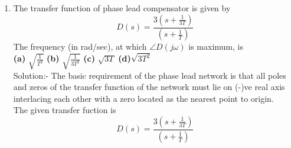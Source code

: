 \documentclass[journal,12pt,twocolumn]{IEEEtran}
\renewcommand\thesection{\arabic{section}}
\begin{document}
\begin{enumerate}[label=\arabic*.,ref=\thesection.\theenumi]
{Solution:- }
Since, each pole corresponds to -20 dB/decade  
and each zero corresponds to +20 dB/decade.\\
Therefore, from the given Bode plot we can get the Transfer equation,\\
\[ G(s) = \frac{k}{s(1+s)(20+s)} \]
\\
Now, from the Transfer equation we can conclude that,
there are three poles (0, -1 and -20 ) and no zeros.\\
\quad \quad \quad $\therefore$ Statement 1 is false \quad \quad \quad ..........(1)








{}
Calculating phase\\
Since we know that,\\
phase $ \phi $ is the sum of all the phases corresponding to each pole and zero.\\
phase corresponding to pole is = \[ - tan^{-1}( \frac{imaginary}{real}) \]
phase corresponding to zero is = \[tan^{-1}( \frac{imaginary}{real})\]





now take,\[  s = j\omega  \]\\

 \[ \Rightarrow  G(j\omega) =  \frac{k}{j\omega(1+j\omega)(20+j\omega)}\]
 \\
Therefore, \\
 \[  \phi =  -tan^{-1}( {\frac{\omega}{0}}) - tan^{-1}(\omega) - tan^{-1}( \frac{\omega}{20})\]

  \[ \phi =  - 90^\circ - tan^{-1}(\omega) - tan^{-1}( \frac{\omega}{20})\]
  \\
  \[\because \omega \to \infty\] 


 
 {}
  \[ \phi =   - 90^\circ - 90^\circ - 90^\circ\]
 \[\phi = -270^\circ\ \]
 \[\phi = -3\pi/2 \] 
\quad \quad \quad $\therefore$ Statement 2 is true \quad \quad \quad \quad ........(2)\\
 thus, from (1) and (2) option (B) is correct.
\item
The transfer function of phase lead compensator is given by $$D(s) = \frac{3(s+\frac{1}{3T})}{(s+\frac{1}{T})}$$ 
The frequency (in rad/sec), at which $\angle D(j\omega)$ is maximum, is \\
\setlength{\lineskip}{1em}
\textbf{(a)} $\sqrt{\frac{1}{T^2}}$ \;\;\;\;\;\; \textbf{(b)} $\sqrt{\frac{1}{3T^2}}$ \;\;\;\;\;\; \textbf{(c)} $\sqrt{3T}$ \;\;\;\;\;\; \textbf{(d)}$\sqrt{3T^2}$
\\
{Solution:- }
 The basic requirement of the phase lead network is that all poles and zeros of the transfer function of the network must lie on (-)ve real axis interlacing each other with a zero located as the nearest point to origin.
   \\
 The given transfer fuction is $$D(s) = \frac{3(s+\frac{1}{3T})}{(s+\frac{1}{T})}$$



\end{enumerate}
\end{document}
